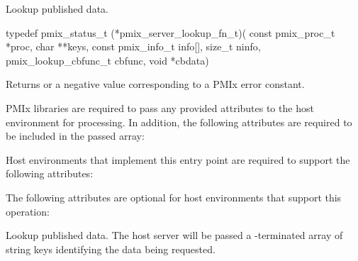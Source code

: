 \summary

Lookup published data.

\format

\cspecificstart
\begin{codepar}
typedef pmix_status_t (*pmix_server_lookup_fn_t)(
                             const pmix_proc_t *proc,
                             char **keys,
                             const pmix_info_t info[],
                             size_t ninfo,
                             pmix_lookup_cbfunc_t cbfunc,
                             void *cbdata)
\end{codepar}
\cspecificend

\begin{arglist}
\end{arglist}

Returns  or a negative value corresponding to a PMIx error constant.

\reqattrstart
\ac{PMIx} libraries are required to pass any provided attributes to the host environment for processing. In addition, the following attributes are required to be included in the passed  array:


Host environments that implement this entry point are required to support the following attributes:


\reqattrend

\optattrstart
The following attributes are optional for host environments that support this operation:


\optattrend


\descr

Lookup published data.
The host server will be passed a -terminated array of string keys identifying the data being requested.

